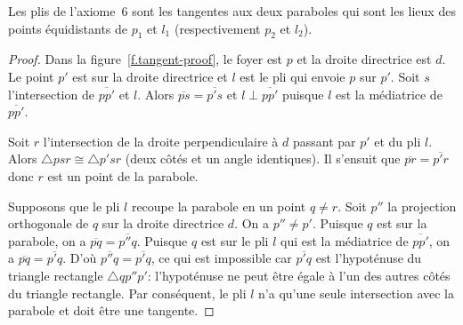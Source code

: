 \begin{theorem}\label{thm.parabola-tangents}
Les plis de l'axiome~$6$ sont les tangentes aux deux paraboles qui sont les lieux des points équidistants de $p_1$ et $l_1$ (respectivement $p_2$ et $l_2$).
\end{theorem}
\begin{proof}
Dans la figure~\ref{f.tangent-proof}, le foyer est $p$ et la droite directrice est $d$. Le point $p'$ est  sur la droite directrice et $l$ est le pli qui envoie $p$ sur $p'$. Soit $s$ l'intersection de $\overline{pp'}$ et $l$. Alors $\overline{ps}=\overline{p's}$ et $l\perp \overline{pp'}$ puisque $l$ est la médiatrice de $\overline{pp'}$.

Soit $r$ l'intersection de la droite perpendiculaire à $d$ passant par $p'$ et du pli $l$. Alors $\triangle psr\cong \triangle p'sr$ (deux côtés et un angle identiques). Il s'ensuit que 
$\overline{pr}=\overline{p'r}$ donc $r$ est un point de la parabole. 

Supposons que le pli $l$ recoupe la parabole en un point $q\neq r$. Soit $p''$ la projection orthogonale de $q$ sur la droite directrice $d$. On a $p''\neq p'$. Puisque $q$ est sur la parabole, on a $\overline{pq}=\overline{p''q}$. Puisque $q$ est sur le pli $l$ qui est la médiatrice de $\overline{pp'}$, on a $\overline{pq}=\overline{p'q}$. D'où $\overline{p''q}=\overline{p'q}$, ce qui est impossible car $\overline{p'q}$ est l'hypoténuse du triangle rectangle $\triangle qp''p'$:  l'hypoténuse ne peut être  égale à l'un des autres côtés du triangle rectangle. Par conséquent, le pli $l$ n'a qu'une seule intersection avec la parabole et doit être une tangente.
\end{proof}



